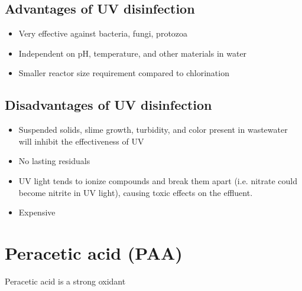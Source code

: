 \subsection{Advantages of UV disinfection}
	\begin{itemize}
		\item Very effective against bacteria, fungi, protozoa
		\item Independent on pH, temperature, and other materials in water
		\item Smaller reactor size requirement compared to chlorination
	\end{itemize}
\subsection{Disadvantages of UV disinfection}
\begin{itemize}
	\item Suspended solids, slime growth, turbidity, and color present in wastewater will inhibit the effectiveness of UV
	\item No lasting residuals
	\item UV light tends to ionize compounds and break them apart (i.e. nitrate could become nitrite in UV light), causing toxic effects on the effluent.
	\item Expensive
\end{itemize}

\section{Peracetic acid (PAA)}

Peracetic acid  is a strong oxidant

